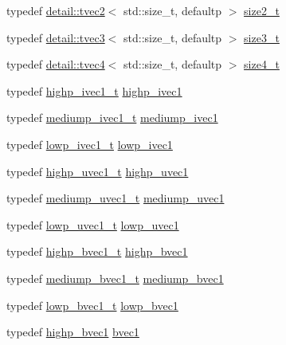 \begin{DoxyCompactItemize}
\item 
typedef \hyperlink{structglm_1_1detail_1_1tvec2}{detail\+::tvec2}$<$ std\+::size\+\_\+t, defaultp $>$ \hyperlink{group__gtx__std__based__type_ga64be170f9203528ff59efa40b1977bb0}{size2\+\_\+t}
\item 
typedef \hyperlink{structglm_1_1detail_1_1tvec3}{detail\+::tvec3}$<$ std\+::size\+\_\+t, defaultp $>$ \hyperlink{group__gtx__std__based__type_gad9ddaab6dd4c37ba46b74a1423ef2ba3}{size3\+\_\+t}
\item 
typedef \hyperlink{structglm_1_1detail_1_1tvec4}{detail\+::tvec4}$<$ std\+::size\+\_\+t, defaultp $>$ \hyperlink{group__gtx__std__based__type_gaaaf9b6a73135945e356601a01beece30}{size4\+\_\+t}
\item 
typedef \hyperlink{structglm_1_1detail_1_1tvec1}{highp\+\_\+ivec1\+\_\+t} \hyperlink{namespaceglm_addb6724b01f125e2730aeaad6130b06f}{highp\+\_\+ivec1}
\item 
typedef \hyperlink{structglm_1_1detail_1_1tvec1}{mediump\+\_\+ivec1\+\_\+t} \hyperlink{namespaceglm_a7efcceaaa791c2380d1b17bd7baa45ee}{mediump\+\_\+ivec1}
\item 
typedef \hyperlink{structglm_1_1detail_1_1tvec1}{lowp\+\_\+ivec1\+\_\+t} \hyperlink{namespaceglm_a5d781b915bec50a9d5b5383835035533}{lowp\+\_\+ivec1}
\item 
typedef \hyperlink{structglm_1_1detail_1_1tvec1}{highp\+\_\+uvec1\+\_\+t} \hyperlink{namespaceglm_a2a480125ab05aa522d883651ea1101f8}{highp\+\_\+uvec1}
\item 
typedef \hyperlink{structglm_1_1detail_1_1tvec1}{mediump\+\_\+uvec1\+\_\+t} \hyperlink{namespaceglm_a1fa5a5fb993ee72b4dc8d2a9caf85b26}{mediump\+\_\+uvec1}
\item 
typedef \hyperlink{structglm_1_1detail_1_1tvec1}{lowp\+\_\+uvec1\+\_\+t} \hyperlink{namespaceglm_ad50d8a6d477675ffc627f0949f1d5615}{lowp\+\_\+uvec1}
\item 
typedef \hyperlink{structglm_1_1detail_1_1tvec1}{highp\+\_\+bvec1\+\_\+t} \hyperlink{namespaceglm_ad24a2ac97dbfbece48f504224bb20b59}{highp\+\_\+bvec1}
\item 
typedef \hyperlink{structglm_1_1detail_1_1tvec1}{mediump\+\_\+bvec1\+\_\+t} \hyperlink{namespaceglm_a6c2cab6a7010331621a5ce656dd5f58d}{mediump\+\_\+bvec1}
\item 
typedef \hyperlink{structglm_1_1detail_1_1tvec1}{lowp\+\_\+bvec1\+\_\+t} \hyperlink{namespaceglm_af22d6a46a35bcda63801fe78c033f35f}{lowp\+\_\+bvec1}
\item 
typedef \hyperlink{namespaceglm_ad24a2ac97dbfbece48f504224bb20b59}{highp\+\_\+bvec1} \hyperlink{namespaceglm_a30260c045e085bb8d19eddca772cac61}{bvec1}

\end{DoxyCompactItemize}
